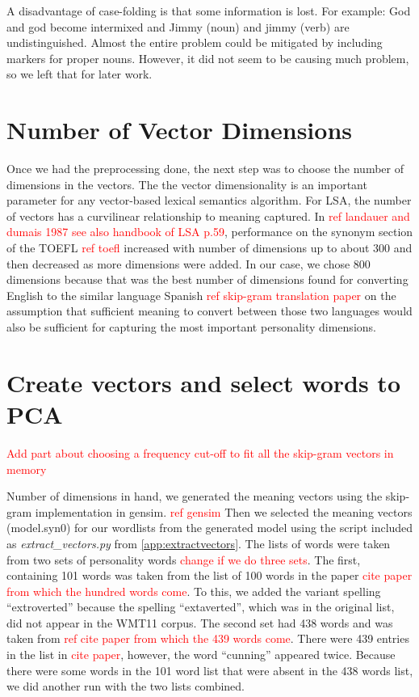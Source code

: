 \documentclass[10pt,letterpaper]{book}
\newcommand{\todo}[1]{\textcolor{red}{#1}}
\newcommand{\filename}[1]{\textit{#1}}
\begin{document}
A disadvantage of case-folding is that some information is lost. For example: God and god become intermixed and Jimmy (noun) and jimmy (verb) are undistinguished. Almost the entire problem could be mitigated by including markers for proper nouns. However, it did not seem to be causing much problem, so we left that for later work.

\section{Number of Vector Dimensions}

Once we had the preprocessing done, the next step was to choose the number of dimensions in the vectors. The the vector dimensionality is an important parameter for any vector-based lexical semantics algorithm. For LSA, the number of vectors has a curvilinear relationship to meaning captured. In \todo{ref landauer and dumais 1987 see also handbook of LSA p.59}, performance on the synonym section of the TOEFL \todo{ref toefl} increased with number of dimensions up to about 300 and then decreased as more dimensions were added. In our case, we chose 800 dimensions because that was the best number of dimensions found for converting English to the similar language Spanish \todo{ref skip-gram translation paper} on the assumption that sufficient meaning to convert between those two languages would also be sufficient for capturing the most important personality dimensions.

\section{Create vectors and select words to PCA}

\todo{Add part about choosing a frequency cut-off to fit all the skip-gram vectors in memory}

Number of dimensions in hand, we generated the meaning vectors using the skip-gram implementation in gensim. \todo{ref gensim} Then we selected the meaning vectors (model.syn0) for our wordlists from the generated model using the script included as \filename{extract\_vectors.py} from \ref{app:extractvectors}. The lists of words were taken from two sets of personality words \todo{change if we do three sets}. The first, containing 101 words was taken from the list of 100 words in the paper \todo{cite paper from which the hundred words come}. To this, we added the variant spelling ``extroverted'' because the spelling ``extaverted'', which was in the original list, did not appear in the WMT11 corpus. The second set had 438 words and was taken from \todo{ref cite paper from which the 439 words come}. There were 439 entries in the list in \todo{cite paper}, however, the word ``cunning'' appeared twice. Because there were some words in the 101 word list that were absent in the 438 words list, we did another run with the two lists combined.
\end{document}
